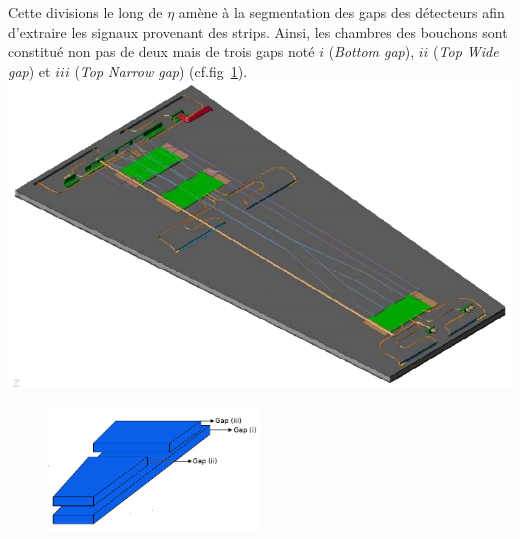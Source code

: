Cette divisions le long de $\eta$ amène à la segmentation des gaps des détecteurs afin d'extraire les signaux provenant des strips. Ainsi, les chambres des bouchons sont constitué non pas de deux mais de trois gaps noté $i$ (\textit{Bottom gap}), $ii$ (\textit{Top Wide gap}) et $iii$ (\textit{Top Narrow gap})
 (cf.fig~\ref{gapslayout}). 
\marginpar
{
	\centering
	\includegraphics[width=\marginparwidth]{RPC/schemerpc.png}
	\label{trap}
}
\begin{figure}[ht!]
	\centering
	\includegraphics[width=0.50\textwidth]{RPC/gaps.png}
	\label{gapslayout}
\end{figure}

\vspace{-0.8cm}
